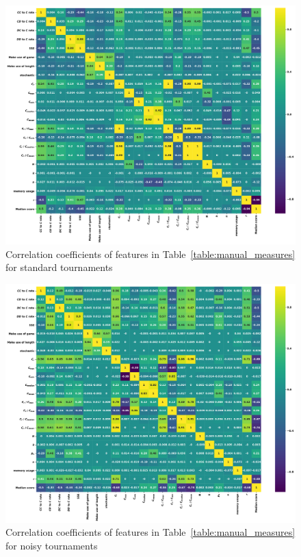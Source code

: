 \documentclass{article}
\begin{document}
\begin{figure}[!htbp]
        \begin{center}
            \includegraphics[width=.75\linewidth]{../images/standard_correlation_plot.pdf}
        \end{center}
        \caption{Correlation coefficients of features in Table~\ref{table:manual_measures}
        for standard tournaments}
\end{figure}
\begin{figure}[!htbp]
    \begin{center}
        \includegraphics[width=.75\linewidth]{../images/noise_correlation_plot.pdf}
    \end{center}
    \caption{Correlation coefficients of features in Table~\ref{table:manual_measures}
    for noisy tournaments}
\end{figure}
\end{document}
